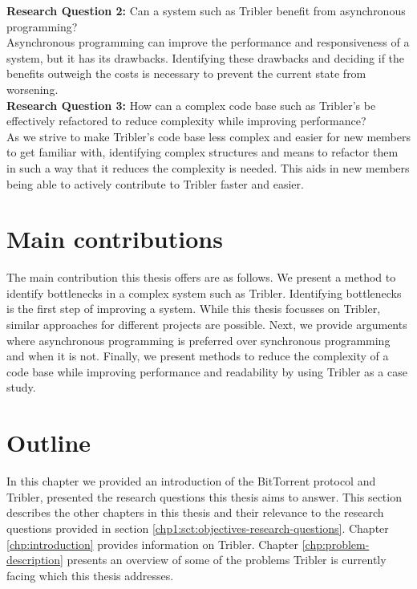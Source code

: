 \textbf{Research Question 2:} Can a system such as Tribler benefit from asynchronous programming?\\

Asynchronous programming can improve the performance and responsiveness of a system, but it has its drawbacks. Identifying these drawbacks and deciding if the benefits outweigh the costs is necessary to prevent the current state from worsening. \\

\noindent
\textbf{Research Question 3:} How can a complex code base such as Tribler's be effectively refactored to reduce complexity while improving performance?\\

As we strive to make Tribler's code base less complex and easier for new members to get familiar with, identifying complex structures and means to refactor them in such a way that it reduces the complexity is needed.
This aids in new members being able to actively contribute to Tribler faster and easier.\

\section{Main contributions}
The main contribution this thesis offers are as follows. We present a method to identify bottlenecks in a complex system such as Tribler. Identifying bottlenecks is the first step of improving a system. While this thesis focusses on Tribler, similar approaches for different projects are possible.
Next, we provide arguments where asynchronous programming is preferred over synchronous programming and when it is not.
Finally, we present methods to reduce the complexity of a code base while improving performance and readability by using Tribler as a case study.


\section{Outline}
In this chapter we provided an introduction of the BitTorrent protocol and Tribler, presented the research questions this thesis aims to answer. This section describes the other chapters in this thesis and their relevance to the research questions provided in section \ref{chp1:sct:objectives-research-questions}.
Chapter \ref{chp:introduction} provides information on Tribler.
Chapter \ref{chp:problem-description} presents an overview of some of the problems Tribler is currently facing which this thesis addresses.
